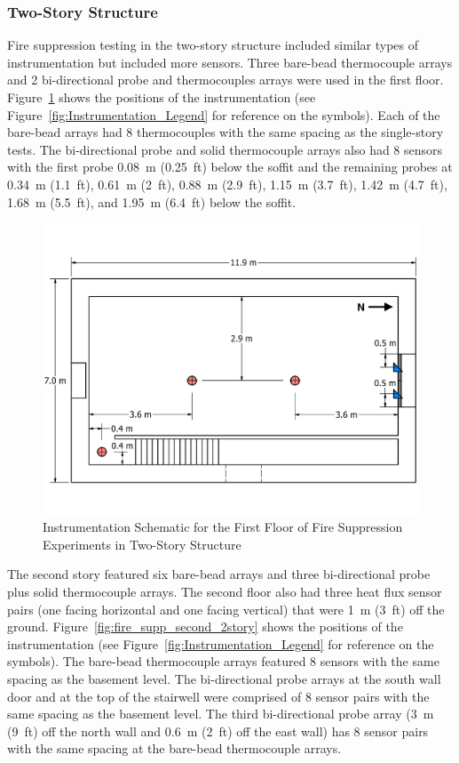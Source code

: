 \documentclass[12pt,oneside]{book}
\begin{document}
\subsubsection*{Two-Story Structure}

Fire suppression testing in the two-story structure included similar types of instrumentation but included more sensors. Three bare-bead thermocouple arrays and 2 bi-directional probe and thermocouples arrays were used in the first floor. Figure~\ref{fig:fire_supp_first_2story} shows the positions of the instrumentation (see Figure~\ref{fig:Instrumentation_Legend} for reference on the symbols). Each of the bare-bead arrays had 8 thermocouples with the same spacing as the single-story tests. The bi-directional probe and solid thermocouple arrays also had 8 sensors with the first probe 0.08~m (0.25~ft) below the soffit and the remaining probes at 0.34~m (1.1~ft), 0.61~m (2~ft), 0.88~m (2.9~ft), 1.15~m (3.7~ft), 1.42~m (4.7~ft), 1.68~m (5.5~ft), and 1.95~m (6.4~ft) below the soffit.

\begin{figure}[!ht]
	\includegraphics[width=\columnwidth]{../../DelCo_2014_2015/Drawings/PDFs/CAFS/West_Structure_1st_Floor_Instrumentation}
	\caption{Instrumentation Schematic for the First Floor of Fire Suppression Experiments in Two-Story Structure}
	\label{fig:fire_supp_first_2story}
\end{figure}

The second story featured six bare-bead arrays and three bi-directional probe plus solid thermocouple arrays. The second floor also had three heat flux sensor pairs (one facing horizontal and one facing vertical) that were 1~m (3~ft) off the ground. Figure~\ref{fig:fire_supp_second_2story} shows the positions of the instrumentation (see Figure~\ref{fig:Instrumentation_Legend} for reference on the symbols). The bare-bead thermocouple arrays featured 8 sensors with the same spacing as the basement level. The bi-directional probe arrays at the south wall door and at the top of the stairwell were comprised of 8 sensor pairs with the same spacing as the basement level. The third bi-directional probe array (3~m (9~ft) off the north wall and 0.6~m (2~ft) off the east wall) has 8 sensor pairs with the same spacing at the bare-bead thermocouple arrays.
\end{document}
